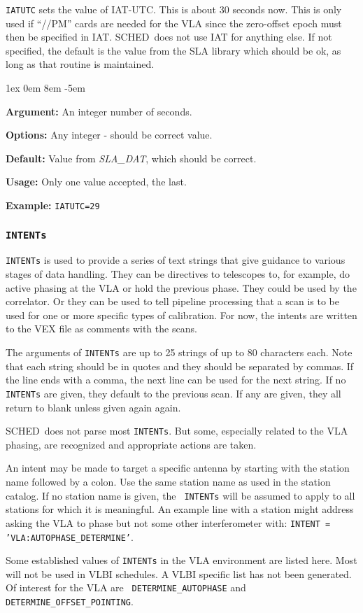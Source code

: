 \documentclass{report}
\newcommand{\schedb}{{\sc SCHED~}}
\newcommand{\rcwbox}[5]{
  \begin{list}{}{\parsep 1ex  \itemsep 0em
                 \leftmargin 8em  \itemindent -5em }
    \item {\bf Argument:} #1
    \item {\bf Options:}  #2
    \item {\bf Default:}  #3
    \item {\bf Usage:}    #4
    \item {\bf Example:}  #5
  \end{list}
}
\begin{document}
{\tt IATUTC} sets the value of IAT-UTC. This is about 30 seconds now.
This is only used if ``//PM'' cards are needed for the VLA since the
zero-offset epoch must then be specified in IAT. \schedb does not
use IAT for anything else.  If not specified, the default is the
value from the SLA library which should be ok, as long as that
routine is maintained.

\rcwbox
{An integer number of seconds.}
{Any integer - should be correct value.}
{Value from {\sl SLA\_DAT}, which should be correct.}
{Only one value accepted, the last.}
{{\tt IATUTC=29}}


\subsubsection{\label{MP:INTENTs}{\tt INTENTs}}

{\tt INTENTs} is used to provide a series of text strings that give
guidance to various stages of data handling.  They can be directives
to telescopes to, for example, do active phasing at the VLA or hold
the previous phase.  They could be used by the correlator.  Or they can
be used to tell pipeline processing that a scan is to be used for one or
more specific types of calibration.  For now, the intents are written
to the VEX file as comments with the scans.

The arguments of {\tt INTENTs} are up to 25 strings of up to 80
characters each.  Note that each string should be in quotes and they
should be separated by commas.  If the line ends with a comma, the
next line can be used for the next string.  If no {\tt INTENTs} are
given, they default to the previous scan.  If any are given, they all
return to blank unless given again again.

\schedb does not parse most {\tt INTENTs}.  But some, especially related
to the VLA phasing, are recognized and appropriate actions are taken.

An intent may be made to target a specific antenna by starting with
the station name followed by a colon.  Use the same station name as
used in the station catalog.  If no station name is given, the {\tt
INTENTs} will be assumed to apply to all stations for which it is
meaningful.  An example line with a station might address asking the
VLA to phase but not some other interferometer with: 
{\tt INTENT = 'VLA:AUTOPHASE\_DETERMINE'}.

Some established values of {\tt INTENTs} in the VLA environment are
listed here.  Most will not be used in VLBI schedules.  A VLBI
specific list has not been generated.  Of interest for the VLA are {\tt
DETERMINE\_AUTOPHASE} and {\tt DETERMINE\_OFFSET\_POINTING}.
\end{document}

